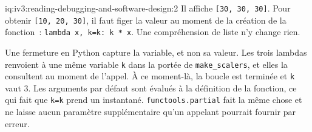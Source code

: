\begin{solution}{iq:iv3:reading-debugging-and-software-design:2}
Il affiche \texttt{[30, 30, 30]}. Pour obtenir \texttt{[10, 20, 30]}, il faut figer la valeur au moment de la création de la fonction~: \texttt{lambda x, k=k: k * x}. Une compréhension de liste n'y change rien.

Une fermeture en Python capture la variable, et non sa valeur. Les trois lambdas renvoient à une même variable \texttt{k} dans la portée de \texttt{make\_scalers}, et elles la consultent au moment de l'appel. À ce moment-là, la boucle est terminée et \texttt{k} vaut 3. Les arguments par défaut sont évalués à la définition de la fonction, ce qui fait que \texttt{k=k} prend un instantané. \texttt{functools.partial} fait la même chose et ne laisse aucun paramètre supplémentaire qu'un appelant pourrait fournir par erreur.


\end{solution}


